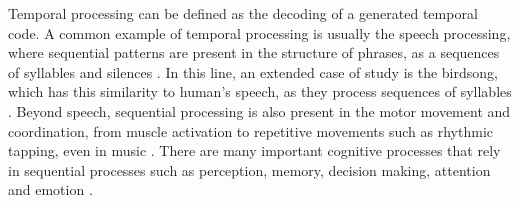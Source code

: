 





Temporal processing can be defined as the decoding of a generated temporal code. A common example of temporal processing is usually the speech processing, where sequential patterns are present in the structure of phrases, as a sequences of syllables and silences \parencite{kiebel_recognizing_2009}. In this line, an extended case of study is the birdsong, which has this similarity to human's speech, as they process sequences of syllables \parencite{prather_brains_2017,fishbein_sound_2019}. Beyond speech, sequential processing is also present in the motor movement and coordination, from muscle activation to repetitive movements such as rhythmic tapping, even in music \parencite{ding_temporal_2017}. There are many important cognitive processes that rely in sequential processes such as perception, memory, decision making, attention and emotion \parencite{Michel and coegin 2018, Ravinovich 2020, He 2018}. 


